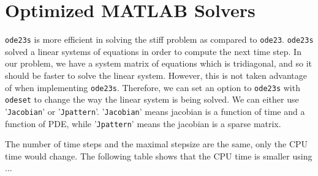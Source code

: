 \documentclass{article}
\begin{document}
\section{Optimized MATLAB Solvers}

\texttt{ode23s} is more efficient in solving the stiff problem as compared to \texttt{ode23}. \texttt{ode23s} solved a linear systems of equations in order to compute the next time step. In our problem, we have a system matrix of equations which is tridiagonal, and so it should be faster to solve the linear system. However, this is not taken advantage of when implementing \texttt{ode23s}. Therefore, we can set an option to \texttt{ode23s} with \texttt{odeset} to change the way the linear system is being solved. We can either use '\texttt{Jacobian}' or '\texttt{Jpattern}'. '\texttt{Jacobian}' means jacobian is a function of time and a function of PDE, while '\texttt{Jpattern}' means the jacobian is a sparse matrix.

The number of time steps and the maximal stepsize are the same, only the CPU time would change. The following table shows that the CPU time is smaller using ...
\end{document}
